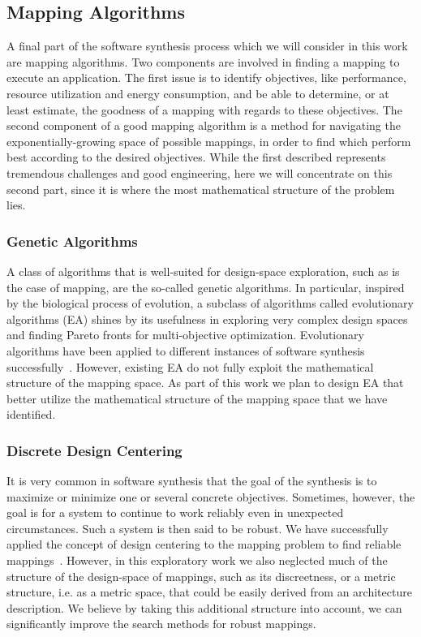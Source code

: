 \documentclass[sigplan,10pt]{acmart}
\begin{document}
\subsection{Mapping Algorithms}
A final part of the software synthesis process which we will consider in this work are mapping algorithms.
Two components are involved in finding a mapping to execute an application.
The first issue is to identify objectives, like performance, resource utilization and energy consumption, and be able to determine, or at least estimate, the goodness of a mapping with regards to these objectives.
The second component of a good mapping algorithm is a method for navigating the exponentially-growing space of possible mappings, in order to find which perform best according to the desired objectives.
While the first described represents tremendous challenges and good engineering, here we will concentrate on this second part, since it is where the most mathematical structure of the problem lies. 

\subsubsection{Genetic Algorithms}
A class of algorithms that is well-suited for design-space exploration, such as is the case of mapping, are the so-called genetic algorithms.
In particular, inspired by the biological process of evolution, a subclass of algorithms called evolutionary algorithms (EA) shines by its usefulness in exploring very complex design spaces and finding Pareto fronts for multi-objective optimization.
Evolutionary algorithms have been applied to different instances of software synthesis successfully~\cite{Quan14}. However, existing EA do not fully exploit the mathematical structure of the mapping space.
As part of this work we plan to design EA that better utilize the mathematical structure of the mapping space that we have identified.

\subsubsection{Discrete Design Centering} 
It is very common in software synthesis that the goal of the synthesis is to maximize or minimize one or several concrete objectives.
Sometimes, however, the goal is for a system to continue to work reliably even in unexpected circumstances. Such a system is then said to be robust. 
We have successfully applied the concept of design centering to the mapping problem to find reliable mappings~\cite{hempel2017robust}.
However, in this exploratory work we also neglected much of the structure of the design-space of mappings, such as its discreetness, or a metric structure, i.e. as a metric space, that could be easily derived from an architecture description.
We believe by taking this additional structure into account, we can significantly improve the search methods for robust mappings.
\end{document}
